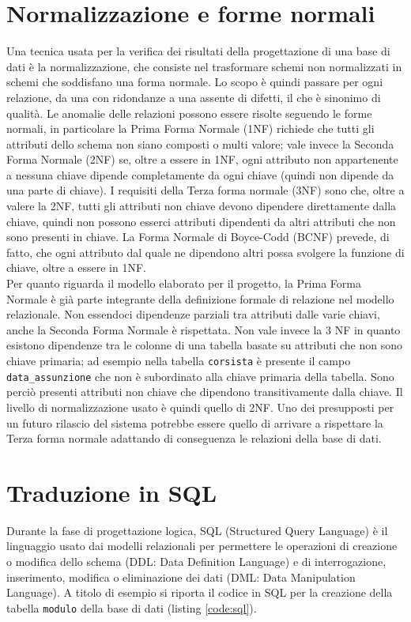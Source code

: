 \section{Normalizzazione e forme normali}
\label{sec:normalizzazione}
Una tecnica usata per la verifica dei risultati della progettazione di una base di dati è la normalizzazione, che consiste nel trasformare schemi non normalizzati in schemi che soddisfano una forma normale. Lo scopo è quindi passare per ogni relazione, da una con ridondanze a una assente di difetti, il che è sinonimo di qualità. Le anomalie delle relazioni possono essere risolte seguendo le forme normali, in particolare la Prima Forma Normale (1NF) richiede che tutti gli attributi dello schema non siano composti o multi valore; vale invece la Seconda Forma Normale (2NF) se, oltre a essere in 1NF, ogni attributo non appartenente a nessuna chiave dipende completamente da ogni chiave (quindi non dipende da una parte di chiave). I requisiti della Terza forma normale (3NF) sono che, oltre a valere la 2NF, tutti gli attributi non chiave devono dipendere direttamente dalla chiave, quindi non possono esserci attributi dipendenti da altri attributi che non sono presenti in chiave. La Forma Normale di Boyce-Codd (BCNF) prevede, di fatto, che ogni attributo dal quale ne dipendono altri possa svolgere la funzione di chiave, oltre a essere in 1NF.\\
\newline
Per quanto riguarda il modello elaborato per il progetto, la Prima Forma Normale è già parte integrante della definizione formale di relazione nel modello relazionale. Non essendoci dipendenze parziali tra attributi dalle varie chiavi, anche la Seconda Forma Normale è rispettata. Non vale invece la 3 NF in quanto esistono dipendenze tra le colonne di una tabella basate su attributi che non sono chiave primaria; ad esempio nella tabella \verb|corsista| è presente il campo \verb|data_assunzione| che non è subordinato alla chiave primaria della tabella. Sono perciò presenti attributi non chiave che dipendono transitivamente dalla chiave. Il livello di normalizzazione usato è quindi quello di 2NF. Uno dei presupposti per un futuro rilascio del sistema potrebbe essere quello di arrivare a rispettare la Terza forma normale adattando di conseguenza le relazioni della base di dati.



\section{Traduzione in SQL}
Durante la fase di progettazione logica, SQL (Structured Query Language) è il linguaggio usato dai modelli relazionali per permettere le operazioni di creazione o modifica dello schema (DDL: Data Definition Language) e di interrogazione, inserimento, modifica o eliminazione dei dati (DML: Data Manipulation Language). A titolo di esempio si riporta il codice in SQL per la creazione della tabella \verb|modulo| della base di dati (listing \ref{code:sql}).


